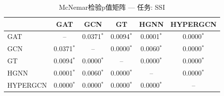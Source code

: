 \begin{table}[htbp]
\centering
\caption{McNemar检验p值矩阵 — 任务: SSI}
\label{tab:mcnemar_SSI}
\begin{tabular}{lccccc}
\toprule
 & GAT & GCN & GT & HGNN & HYPERGCN \\
\midrule
GAT & -- & 0.0371$^*$ & 0.0094$^*$ & 0.0001$^*$ & 0.0000$^*$ \\
GCN & 0.0371$^*$ & -- & 0.0000$^*$ & 0.0060$^*$ & 0.0000$^*$ \\
GT & 0.0094$^*$ & 0.0000$^*$ & -- & 0.0000$^*$ & 0.0000$^*$ \\
HGNN & 0.0001$^*$ & 0.0060$^*$ & 0.0000$^*$ & -- & 0.0000$^*$ \\
HYPERGCN & 0.0000$^*$ & 0.0000$^*$ & 0.0000$^*$ & 0.0000$^*$ & -- \\
\bottomrule
\end{tabular}
\end{table}
